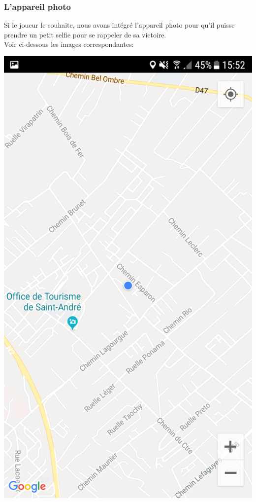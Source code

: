 \documentclass{article}
\begin{document}
\subsubsection{L'appareil photo}
Si le joueur le souhaite, nous avons intégré l'appareil photo pour qu'il puisse prendre un petit selfie pour se rappeler de sa victoire.\\

Voir ci-dessous les images correspondantes:

\begin{center}
    \includegraphics[scale = 0.18]{images/Android_2.png}

\end{center}
\end{document}
